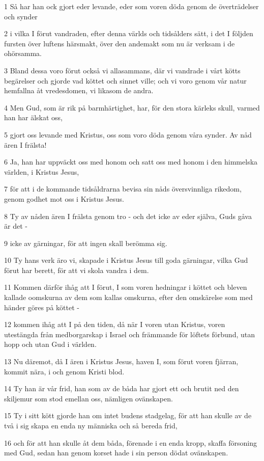 \par 1 Så har han ock gjort eder levande, eder som voren döda genom de överträdelser och synder
\par 2 i vilka I förut vandraden, efter denna världs och tidsålders sätt, i det I följden fursten över luftens härsmakt, över den andemakt som nu är verksam i de ohörsamma.
\par 3 Bland dessa voro förut också vi allasammans, där vi vandrade i vårt kötts begärelser och gjorde vad köttet och sinnet ville; och vi voro genom vår natur hemfallna åt vredesdomen, vi likasom de andra.
\par 4 Men Gud, som är rik på barmhärtighet, har, för den stora kärleks skull, varmed han har älskat oss,
\par 5 gjort oss levande med Kristus, oss som voro döda genom våra synder. Av nåd ären I frälsta!
\par 6 Ja, han har uppväckt oss med honom och satt oss med honom i den himmelska världen, i Kristus Jesus,
\par 7 för att i de kommande tidsåldrarna bevisa sin nåds översvinnliga rikedom, genom godhet mot oss i Kristus Jesus.
\par 8 Ty av nåden ären I frälsta genom tro - och det icke av eder själva, Guds gåva är det -
\par 9 icke av gärningar, för att ingen skall berömma sig.
\par 10 Ty hans verk äro vi, skapade i Kristus Jesus till goda gärningar, vilka Gud förut har berett, för att vi skola vandra i dem.
\par 11 Kommen därför ihåg att I förut, I som voren hedningar i köttet och bleven kallade oomskurna av dem som kallas omskurna, efter den omskärelse som med händer göres på köttet -
\par 12 kommen ihåg att I på den tiden, då när I voren utan Kristus, voren utestängda från medborgarskap i Israel och främmande för löftets förbund, utan hopp och utan Gud i världen.
\par 13 Nu däremot, då I ären i Kristus Jesus, haven I, som förut voren fjärran, kommit nära, i och genom Kristi blod.
\par 14 Ty han är vår frid, han som av de båda har gjort ett och brutit ned den skiljemur som stod emellan oss, nämligen ovänskapen.
\par 15 Ty i sitt kött gjorde han om intet budens stadgelag, för att han skulle av de två i sig skapa en enda ny människa och så bereda frid,
\par 16 och för att han skulle åt dem båda, förenade i en enda kropp, skaffa försoning med Gud, sedan han genom korset hade i sin person dödat ovänskapen.
